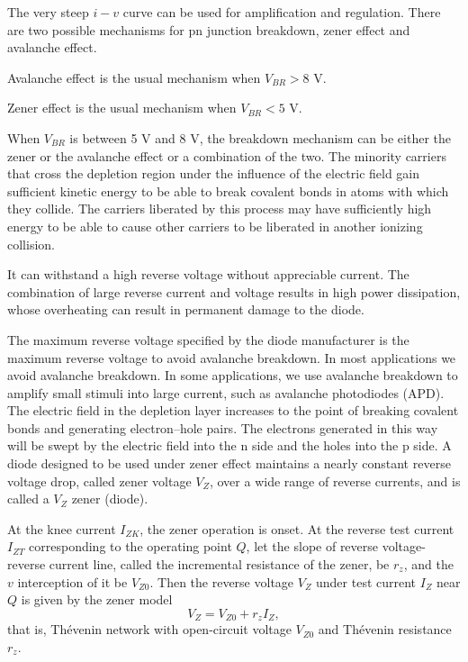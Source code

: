 \documentclass[a4paper,12pt]{report}
\begin{document}
The very steep $i-v$ curve can be used for amplification and regulation.
There are two possible mechanisms for pn junction breakdown, zener effect and avalanche effect.
\bit
\item Avalanche effect is the usual mechanism when $V_{BR}>8$ V.
\item Zener effect is the usual mechanism when $V_{BR}<5$ V.
\item When $V_{BR}$ is between 5 V and 8 V, the breakdown mechanism can be either the zener or the avalanche effect or a combination of the two.
\eit
{}
The minority carriers that cross the depletion region under the influence of the electric field gain sufficient kinetic energy to be able to break covalent bonds in atoms with which they collide. The carriers liberated by this process may have sufficiently high energy to be able to cause other carriers to be liberated in another ionizing collision.

It can withstand a high reverse voltage without appreciable current. The combination of large reverse current and voltage results in high power dissipation, whose overheating can result in permanent damage to the diode.

The maximum reverse voltage specified by the diode manufacturer is the maximum reverse voltage to avoid avalanche breakdown. In most applications we avoid avalanche breakdown. In some applications, we use avalanche breakdown to amplify small stimuli into large current, such as avalanche photodiodes (APD).
The electric field in the depletion layer increases to the point of breaking covalent bonds and generating electron–hole pairs. The electrons generated in this way will be swept by the electric field into the n side and the holes into the p side. A diode designed to be used under zener effect maintains a nearly constant reverse voltage drop, called zener voltage $V_Z$, over a wide range of reverse currents, and is called a $V_Z$ zener (diode).

At the knee current $I_{ZK}$, the zener operation is onset. At the reverse test current $I_{ZT}$ corresponding to the operating point $Q$, let the slope of reverse voltage-reverse current line, called the incremental resistance of the zener, be $r_z$, and the $v$ interception of it be $V_{Z0}$. Then the reverse voltage $V_Z$ under test current $I_Z$ near $Q$ is given by the zener model
\[V_Z=V_{Z0}+r_zI_Z,\]
that is, Thévenin network with open-circuit voltage $V_{Z0}$ and Thévenin resistance $r_z$.
\end{document}
